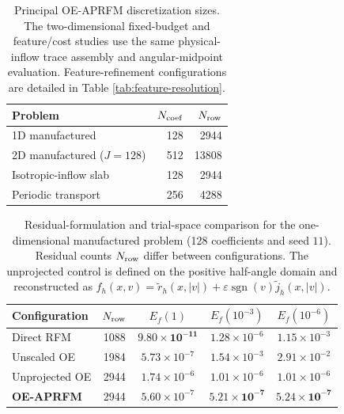 \begin{table}[!htb]
\centering
\small
\setlength{\tabcolsep}{5pt}
\caption{Principal OE-APRFM discretization sizes.
The two-dimensional fixed-budget and feature/cost studies use the same physical-inflow trace assembly and angular-midpoint evaluation.
Feature-refinement configurations are detailed in Table \ref{tab:feature-resolution}.}
\label{tab:configurations}
\begin{tabular}{lrr}
\toprule
Problem & $N_{\rm coef}$ & $N_{\rm row}$\\
\midrule
1D manufactured & 128 & 2944\\
2D manufactured ($J=128$) & 512 & 13808\\
Isotropic-inflow slab & 128 & 2944\\
Periodic transport & 256 & 4288\\
\bottomrule
\end{tabular}
\end{table}

\begin{table}[!htb]
\centering
\small
\setlength{\tabcolsep}{5pt}
\caption{Residual-formulation and trial-space comparison for the one-dimensional manufactured problem (128 coefficients and seed $11$).
Residual counts $N_{\rm row}$ differ between configurations.
The unprojected control is defined on the positive half-angle domain and reconstructed as
$f_h(x,v)=\widetilde r_h(x,|v|)+\varepsilon\operatorname{sgn}(v)\widetilde j_h(x,|v|)$.}
\label{tab:mechanism}
\begin{tabular}{lcccc}
\toprule
Configuration
& $N_{\rm row}$
& $E_f(1)$
& $E_f(10^{-3})$
& $E_f(10^{-6})$ \\
\midrule
Direct RFM
& 1088
& $\boldsymbol{9.80\times10^{-11}}$
& $1.28\times10^{-6}$
& $1.15\times10^{-3}$ \\
Unscaled OE
& 1984
& $5.73\times10^{-7}$
& $1.54\times10^{-3}$
& $2.91\times10^{-2}$ \\
Unprojected OE
& 2944
& $1.74\times10^{-6}$
& $1.01\times10^{-6}$
& $1.01\times10^{-6}$ \\
\addlinespace[3pt]
\textbf{OE-APRFM}
& 2944
& $5.60\times10^{-7}$
& $\boldsymbol{5.21\times10^{-7}}$
& $\boldsymbol{5.24\times10^{-7}}$ \\
\bottomrule
\end{tabular}
\end{table}

